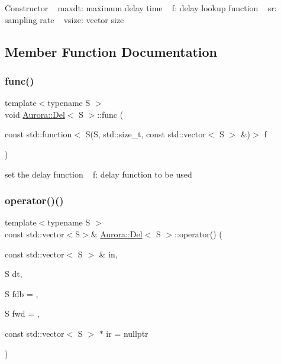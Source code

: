Constructor ~\newline
maxdt\+: maximum delay time ~\newline
f\+: delay lookup function ~\newline
sr\+: sampling rate ~\newline
vsize\+: vector size 

\subsection{Member Function Documentation}
\mbox{\label{class_aurora_1_1_del_aeaf2a09c658c57e3e29793ea8af092d3}} 
\subsubsection{\texorpdfstring{func()}{func()}}
{\footnotesize\ttfamily template$<$typename S $>$ \\
void \hyperlink{class_aurora_1_1_del}{Aurora\+::\+Del}$<$ S $>$\+::func (\begin{DoxyParamCaption}\item[{const std\+::function$<$ S(S, std\+::size\+\_\+t, const std\+::vector$<$ S $>$ \&)$>$}]{f }\end{DoxyParamCaption})\hspace{0.3cm}{\ttfamily [inline]}}

set the delay function ~\newline
f\+: delay function to be used \mbox{\label{class_aurora_1_1_del_ae65031a108546fdd299e50929b394bad}} 
\subsubsection{\texorpdfstring{operator()()}{operator()()}\hspace{0.1cm}{\footnotesize\ttfamily [1/4]}}
{\footnotesize\ttfamily template$<$typename S $>$ \\
const std\+::vector$<$S$>$\& \hyperlink{class_aurora_1_1_del}{Aurora\+::\+Del}$<$ S $>$\+::operator() (\begin{DoxyParamCaption}\item[{const std\+::vector$<$ S $>$ \&}]{in,  }\item[{S}]{dt,  }\item[{S}]{fdb = {},  }\item[{S}]{fwd = {},  }\item[{const std\+::vector$<$ S $>$ $\ast$}]{ir = {\ttfamily nullptr} }\end{DoxyParamCaption})\hspace{0.3cm}{\ttfamily [inline]}}

